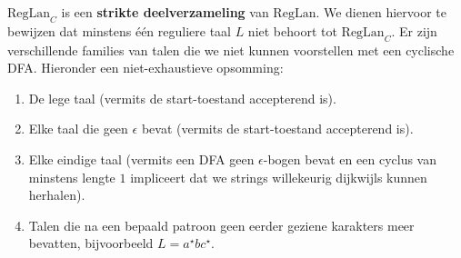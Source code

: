 \documentclass{article}
\begin{document}
\begin{question}[]
\begin{answer}
$\mbox{RegLan}_C$ is een \textbf{strikte deelverzameling} van $\mbox{RegLan}$. We dienen hiervoor te bewijzen dat minstens \'e\'en reguliere taal $L$ niet behoort tot $\mbox{RegLan}_C$. Er zijn verschillende families van talen die we niet kunnen voorstellen met een cyclische DFA. Hieronder een niet-exhaustieve opsomming:
\begin{enumerate}
 \item De lege taal (vermits de start-toestand accepterend is).
 \item Elke taal die geen $\epsilon$ bevat (vermits de start-toestand accepterend is).
 \item Elke eindige taal (vermits een DFA geen $\epsilon$-bogen bevat en een cyclus van minstens lengte $1$ impliceert dat we strings willekeurig dijkwijls kunnen herhalen).
 \item Talen die na een bepaald patroon geen eerder geziene karakters meer bevatten, bijvoorbeeld $L=a^{\star}bc^{\star}$.
\end{enumerate}
\end{answer}
\end{question}
\end{document}
